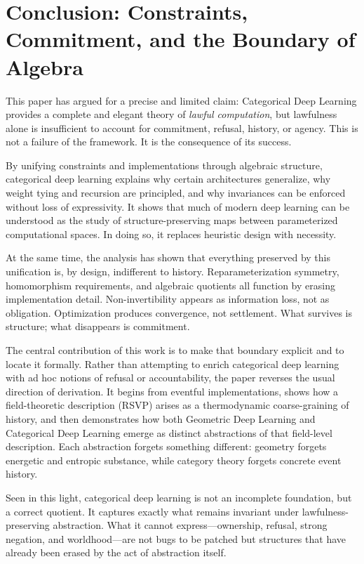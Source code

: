 \documentclass[11pt]{article}
\begin{document}
\section{Conclusion: Constraints, Commitment, and the Boundary of Algebra}

This paper has argued for a precise and limited claim: Categorical Deep Learning
provides a complete and elegant theory of \emph{lawful computation}, but lawfulness
alone is insufficient to account for commitment, refusal, history, or agency.
This is not a failure of the framework. It is the consequence of its success.

By unifying constraints and implementations through algebraic structure,
categorical deep learning explains why certain architectures generalize, why
weight tying and recursion are principled, and why invariances can be enforced
without loss of expressivity. It shows that much of modern deep learning can be
understood as the study of structure-preserving maps between parameterized
computational spaces. In doing so, it replaces heuristic design with necessity.

At the same time, the analysis has shown that everything preserved by this
unification is, by design, indifferent to history. Reparameterization symmetry,
homomorphism requirements, and algebraic quotients all function by erasing
implementation detail. Non-invertibility appears as information loss, not as
obligation. Optimization produces convergence, not settlement. What survives is
structure; what disappears is commitment.

The central contribution of this work is to make that boundary explicit and to
locate it formally. Rather than attempting to enrich categorical deep learning
with ad hoc notions of refusal or accountability, the paper reverses the usual
direction of derivation. It begins from eventful implementations, shows how a
field-theoretic description (RSVP) arises as a thermodynamic coarse-graining of
history, and then demonstrates how both Geometric Deep Learning and Categorical
Deep Learning emerge as distinct abstractions of that field-level description.
Each abstraction forgets something different: geometry forgets energetic and
entropic substance, while category theory forgets concrete event history.

Seen in this light, categorical deep learning is not an incomplete foundation,
but a correct quotient. It captures exactly what remains invariant under
lawfulness-preserving abstraction. What it cannot express—ownership, refusal,
strong negation, and worldhood—are not bugs to be patched but structures that have
already been erased by the act of abstraction itself.
\end{document}
